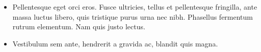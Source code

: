 \documentclass[landscape,a0paper,fontscale=0.285]{baposter} %
\newcommand{\compresslist}{ %
\setlength{\itemsep}{1pt}
\setlength{\parskip}{0pt}
\setlength{\parsep}{0pt}
}
\begin{document}
\begin{poster}
{\begin{multicols}{2}

\begin{itemize}\compresslist
\item Pellentesque eget orci eros. Fusce ultricies, tellus et pellentesque fringilla, ante massa luctus libero, quis tristique purus urna nec nibh. Phasellus fermentum rutrum elementum. Nam quis justo lectus.
\item Vestibulum sem ante, hendrerit a gravida ac, blandit quis magna.
\end{itemize}

\end{multicols}
}


\end{poster}
\end{document}

